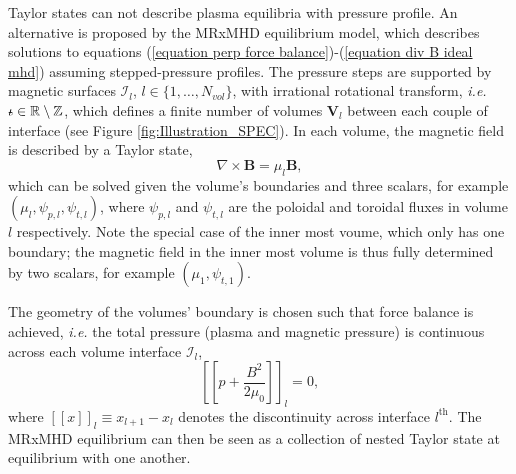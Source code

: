\documentclass[my_thesis.tex]{subfiles}
\begin{document}
Taylor states can not describe plasma equilibria with pressure profile. An alternative is proposed by the MRxMHD equilibrium model, which describes solutions to equations (\ref{equation perp force balance})-(\ref{equation div B ideal mhd}) assuming stepped-pressure profiles. The pressure steps are supported by magnetic surfaces $\mathcal{I}_l$, $l\in\{1,\ldots,N_{vol}\}$, with irrational rotational transform, \textit{i.e.} $\text{$\iota\!\!$-}\in\mathbb{R}\setminus\mathbb{Z}$, which defines a finite number of volumes $\mathbf{V}_l$ between each couple of interface (see Figure \ref{fig:Illustration_SPEC}). In each volume, the magnetic field is described by a Taylor state, 
\begin{equation}
	\nabla\times\mathbf{B}=\mu_l\mathbf{B}, \label{eq.BeltramiEquation}
\end{equation}
which can be solved given the volume's boundaries and three scalars, for example $(\mu_l,\psi_{p,l},\psi_{t,l})$, where $\psi_{p,l}$ and $\psi_{t,l}$ are the poloidal and toroidal fluxes in volume $l$ respectively. Note the special case of the inner most voume, which only has one boundary; the magnetic field in the inner most volume is thus fully determined by two scalars, for example $(\mu_1,\psi_{t,1})$.

The geometry of the volumes' boundary is chosen such that force balance is achieved, \textit{i.e.} the total pressure (plasma and magnetic pressure) is continuous across each volume interface $\mathcal{I}_l$,
\begin{equation}
	\left[\left[p + \frac{B^2}{2\mu_0}\right]\right]_l = 0, \label{eq.force_balance}
\end{equation}
where $[[x]]_l\equiv x_{l+1}-x_l$ denotes the discontinuity across interface $l^{\text{th}}$. The MRxMHD equilibrium can then be seen as a collection of nested Taylor state at equilibrium with one another. 
\end{document}
